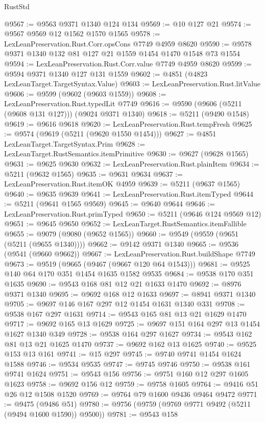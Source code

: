 \begin{lexlean}{RustStd}
\begin{coremodule}
@9567 := @9563 @9371 @1340 @124 @134
@9569 := @10 @127 @21
@9574 := @9567 @9569 @12 @1562 @1570 @1565
@9578 := LexLeanPreservation.Rust.Corr.opsCons @7749 @4959 @8620
@9590 := @9578 @9371 @1340 @132 @81 @127 @21 @1559 @1454 @1470 @1548 @73 @1554
@9594 := LexLeanPreservation.Rust.Corr.value @7749 @4959 @8620
@9599 := @9594 @9371 @1340 @127 @131 @1559
@9602 := @4851 (@4823 LexLeanTarget.TargetSyntax.Value)
@9603 := LexLeanPreservation.Rust.litValue
@9606 := @9599 (@9602 (@9603 @1559))
@9608 := LexLeanPreservation.Rust.typedLit @7749
@9616 := @9590 (@9606 (@5211 (@9608 @131 @127))) (@9024 @9371 @1340)
@9618 := @5211 (@9490 @1548)
@9619 := @9616 @9618
@9620 := LexLeanPreservation.Rust.tempFresh
@9625 := @9574 (@9619 (@5211 (@9620 @1550 @1454)))
@9627 := @4851 LexLeanTarget.TargetSyntax.Prim
@9628 := LexLeanTarget.RustSemantics.itemPrimitive
@9630 := @9627 (@9628 @1565)
@9631 := @9625 @9630
@9632 := LexLeanPreservation.Rust.plainItem
@9634 := @5211 (@9632 @1565)
@9635 := @9631 @9634
@9637 := LexLeanPreservation.Rust.itemOK @4959
@9639 := @5211 (@9637 @1565)
@9640 := @9635 @9639
@9641 := LexLeanPreservation.Rust.itemTyped
@9644 := @5211 (@9641 @1565 @9569)
@9645 := @9640 @9644
@9646 := LexLeanPreservation.Rust.primTyped
@9650 := @5211 (@9646 @124 @9569 @12)
@9651 := @9645 @9650
@9652 := LexLeanTarget.RustSemantics.itemFallible
@9655 := @9079 (@9080 (@9652 @1565))
@9660 := @9549 (@9559 (@9651 (@5211 (@9655 @1340))))
@9662 := @9142 @9371 @1340
@9665 := @9536 (@9541 (@9660 @9662))
@9667 := LexLeanPreservation.Rust.buildShape @7749
@9673 := @9519 (@9665 (@9467 (@9667 @120 @64 @1543)))
@9681 := @9525 @140 @64 @170 @351 @1454 @1635 @1582 @9535
@9684 := @9538 @170 @351 @1635
@9690 := @9543 @168 @81 @12 @21 @1633 @1470
@9692 := @8976 @9371 @1340
@9695 := @9692 @168 @12 @1633
@9697 := @8941 @9371 @1340
@9705 := @9697 @146 @167 @297 @12 @1454 @1631 @1340 @331
@9708 := @9538 @167 @297 @1631
@9714 := @9543 @165 @81 @13 @21 @1629 @1470
@9717 := @9692 @165 @13 @1629
@9725 := @9697 @151 @164 @297 @13 @1454 @1627 @1340 @349
@9728 := @9538 @164 @297 @1627
@9734 := @9543 @162 @81 @13 @21 @1625 @1470
@9737 := @9692 @162 @13 @1625
@9740 := @9525 @153 @13 @161
@9741 := @15 @297
@9745 := @9740 @9741 @1454 @1624 @1588
@9746 := @9534 @9535
@9747 := @9745 @9746
@9750 := @9538 @161 @9741 @1624
@9751 := @9543 @156
@9756 := @9751 @160 @12 @297 @1605 @1623
@9758 := @9692 @156 @12
@9759 := @9758 @1605
@9764 := @9416 @51 @26 @12 @1508 @1520
@9769 := @9764 @79 @1600 @9436 @9464 @9472
@9771 := @9475 (@9486 @51)
@9780 := @9756 (@9759 (@9769 @9771 @9492 (@5211 (@9494 @1600 @1590)) @9500))
@9781 := @9543 @158

\end{coremodule}
\end{lexlean}

